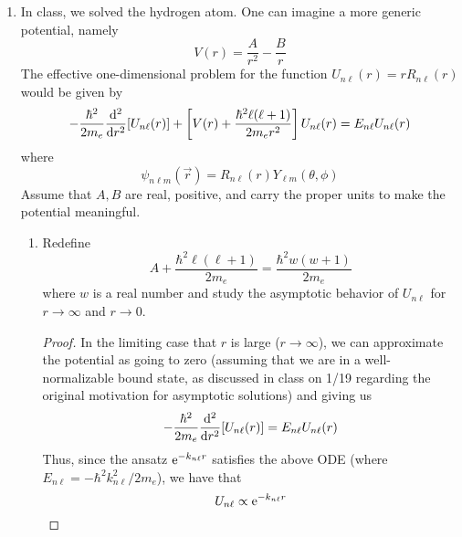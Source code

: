 \documentclass[../psets.tex]{subfiles}
\begin{document}
\begin{enumerate}
\begin{enumerate}
\begin{proof}
        \end{proof}
    \end{enumerate}
    \item In class, we solved the hydrogen atom. One can imagine a more generic potential, namely
    \begin{equation}
        V(r) = \frac{A}{r^2}-\frac{B}{r}
    \end{equation}
    The effective one-dimensional problem for the function $U_{n\ell}(r)=rR_{n\ell}(r)$ would be given by
    \begin{equation}
        -\frac{\hbar^2}{2m_e}\dv[2]{r}[U_{n\ell}(r)]+\left[ V(r)+\frac{\hbar^2\ell(\ell+1)}{2m_er^2} \right]U_{n\ell}(r) = E_{n\ell}U_{n\ell}(r)
    \end{equation}
    where
    \begin{equation}
        \psi_{n\ell m}(\vec{r}) = R_{n\ell}(r)Y_{\ell m}(\theta,\phi)
    \end{equation}
    Assume that $A,B$ are real, positive, and carry the proper units to make the potential meaningful.
    \begin{enumerate}
        \item Redefine
        \begin{equation}
            A+\frac{\hbar^2\ell(\ell+1)}{2m_e} = \frac{\hbar^2w(w+1)}{2m_e}
        \end{equation}
        where $w$ is a real number and study the asymptotic behavior of $U_{n\ell}$ for $r\to\infty$ and $r\to 0$.
        \begin{proof}
            In the limiting case that $r$ is large ($r\to\infty$), we can approximate the potential as going to zero (assuming that we are in a well-normalizable bound state, as discussed in class on 1/19 regarding the original motivation for asymptotic solutions) and giving us
            \begin{equation*}
                -\frac{\hbar^2}{2m_e}\dv[2]{r}[U_{n\ell}(r)] = E_{n\ell}U_{n\ell}(r)
            \end{equation*}
            Thus, since the ansatz $\e[-k_{n\ell}r]$ satisfies the above ODE (where $E_{n\ell}=-\hbar^2k_{n\ell}^2/2m_e$), we have that
            \begin{equation*}
                U_{n\ell} \propto \e[-k_{n\ell}r]
            \end{equation*}

\end{proof}
\end{enumerate}
\end{enumerate}
\end{document}

